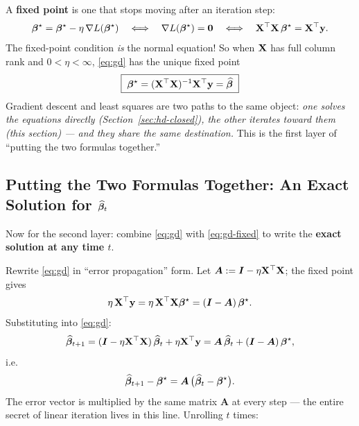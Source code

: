 A \textbf{fixed point} is one that stops moving after an iteration step:
\begin{equation}\label{eq:fixed}
  \bm{\beta}^\star = \bm{\beta}^\star - \eta\, \nabla L(\bm{\beta}^\star)
  \quad\Longleftrightarrow\quad
  \nabla L(\bm{\beta}^\star) = \mathbf{0}
  \quad\Longleftrightarrow\quad
  \mathbf{X}^\top \mathbf{X} \, \bm{\beta}^\star = \mathbf{X}^\top \mathbf{y} .
\end{equation}
The fixed-point condition \emph{is} the normal equation! So when $\mathbf{X}$ has full column rank and $0 < \eta < \infty$, \eqref{eq:gd} has the unique fixed point
\begin{equation}\label{eq:gd-fixed}
  \boxed{\;\bm{\beta}^\star = (\mathbf{X}^\top \mathbf{X})^{-1} \mathbf{X}^\top \mathbf{y} = \widehat{\bm{\beta}}\;}
\end{equation}
Gradient descent and least squares are two paths to the same object: \textit{one solves the equations directly (Section~\ref{sec:hd-closed}), the other iterates toward them (this section) — and they share the same destination.} This is the first layer of ``putting the two formulas together.''

\subsection[Putting the Two Formulas Together: The Exact Solution for the Iterate]{Putting the Two Formulas Together: An Exact Solution for $\widehat{\bm{\beta}}_t$}\label{sec:gd-exact}

Now for the second layer: combine \eqref{eq:gd} with \eqref{eq:gd-fixed} to write the \textbf{exact solution at any time $t$}.

Rewrite \eqref{eq:gd} in ``error propagation'' form. Let $\bm{A} := \bm{I} - \eta \mathbf{X}^\top \mathbf{X}$; the fixed point gives
\[
  \eta\, \mathbf{X}^\top \mathbf{y} = \eta\, \mathbf{X}^\top \mathbf{X} \bm{\beta}^\star = (\bm{I} - \bm{A})\, \bm{\beta}^\star .
\]
Substituting into \eqref{eq:gd}:
\[
  \widehat{\bm{\beta}}_{t+1} = (\bm{I} - \eta \mathbf{X}^\top\mathbf{X})\, \widehat{\bm{\beta}}_t + \eta \mathbf{X}^\top \mathbf{y}
  = \bm{A}\, \widehat{\bm{\beta}}_t + (\bm{I} - \bm{A})\, \bm{\beta}^\star,
\]
i.e.
\[
  \widehat{\bm{\beta}}_{t+1} - \bm{\beta}^\star = \bm{A}\, \big( \widehat{\bm{\beta}}_t - \bm{\beta}^\star \big).
\]
The error vector is multiplied by the same matrix $\bm{A}$ at every step — the entire secret of linear iteration lives in this line. Unrolling $t$ times:

